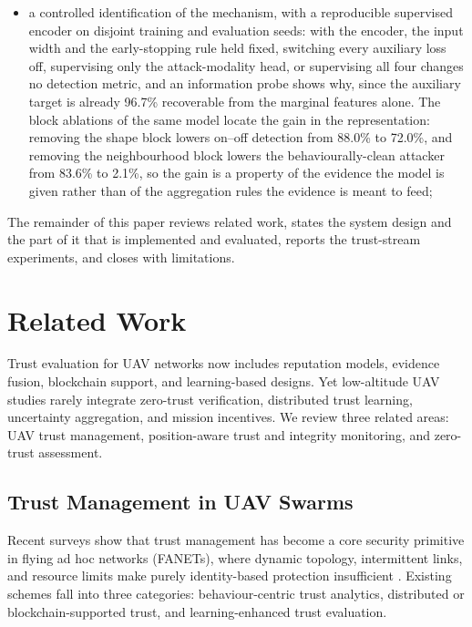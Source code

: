 \documentclass[notspecified,article,submit,moreauthors]{Definitions/mdpi}
\begin{document}
\begin{itemize}
    \item a controlled identification of the mechanism, with a reproducible supervised encoder on disjoint training and evaluation seeds: with the encoder, the input width and the early-stopping rule held fixed, switching every auxiliary loss off, supervising only the attack-modality head, or supervising all four changes no detection metric, and an information probe shows why, since the auxiliary target is already 96.7\% recoverable from the marginal features alone. The block ablations of the same model locate the gain in the representation: removing the shape block lowers on--off detection from 88.0\% to 72.0\%, and removing the neighbourhood block lowers the behaviourally-clean attacker from 83.6\% to 2.1\%, so the gain is a property of the evidence the model is given rather than of the aggregation rules the evidence is meant to feed;
\end{itemize}

The remainder of this paper reviews related work, states the system design and the part of it that is implemented and evaluated, reports the trust-stream experiments, and closes with limitations.

\section{Related Work}
Trust evaluation for UAV networks now includes reputation models, evidence fusion, blockchain support, and learning-based designs. Yet low-altitude UAV studies rarely integrate zero-trust verification, distributed trust learning, uncertainty aggregation, and mission incentives. We review three related areas: UAV trust management, position-aware trust and integrity monitoring, and zero-trust assessment.

\subsection{Trust Management in UAV Swarms}
Recent surveys show that trust management has become a core security primitive in flying ad hoc networks (FANETs), where dynamic topology, intermittent links, and resource limits make purely identity-based protection insufficient \cite{kundu2024survey,noor2020fanet,brik2020fluav,nguyen2021fliotsurvey,qu2021dflun}. Existing schemes fall into three categories: behaviour-centric trust analytics, distributed or blockchain-supported trust, and learning-enhanced trust evaluation.
\end{document}

